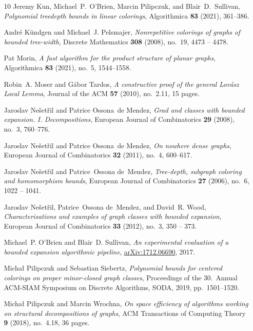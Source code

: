 \begin{thebibliography}{10}
Jeremy Kun, Michael~P.\ O'Brien, Marcin Pilipczuk, and Blair~D.\ Sullivan,
  \emph{Polynomial treedepth bounds in linear colorings}, Algorithmica
  \textbf{83} (2021), 361--386.

André Kündgen and Michael~J. Pelsmajer, \emph{Nonrepetitive colorings of
  graphs of bounded tree-width}, Discrete Mathematics \textbf{308} (2008),
  no.~19, 4473 -- 4478.

Pat Morin, \emph{A fast algorithm for the product structure of planar graphs},
  Algorithmica \textbf{83} (2021), no.~5, 1544--1558.

Robin~A. Moser and G\'{a}bor Tardos, \emph{A constructive proof of the general
  {L}ov\'{a}sz {L}ocal {L}emma}, Journal of the ACM \textbf{57} (2010),
  no.~2.11, 15 pages.

Jaroslav Ne{\v{s}}et{\v{r}}il and Patrice Ossona~de Mendez, \emph{Grad and
  classes with bounded expansion. {I}. {D}ecompositions}, European Journal of
  Combinatorics \textbf{29} (2008), no.~3, 760--776.

{J}aroslav Ne{\v{s}}et{\v{r}}il and Patrice Ossona~de Mendez, \emph{On nowhere
  dense graphs}, European Journal of Combinatorics \textbf{32} (2011), no.~4,
  600--617.

Jaroslav Nešetřil and Patrice~Ossona de~Mendez, \emph{Tree-depth, subgraph
  coloring and homomorphism bounds}, European Journal of Combinatorics
  \textbf{27} (2006), no.~6, 1022 -- 1041.

Jaroslav Nešetřil, Patrice~Ossona de~Mendez, and David~R. Wood,
  \emph{Characterisations and examples of graph classes with bounded
  expansion}, European Journal of Combinatorics \textbf{33} (2012), no.~3, 350
  -- 373.

Michael~P. O’Brien and Blair~D. Sullivan, \emph{An experimental evaluation of
  a bounded expansion algorithmic pipeline},
  \href{https://arxiv.org/abs/1712.06690}{arXiv:1712.06690}, 2017.

Micha{\l} Pilipczuk and Sebastian Siebertz, \emph{Polynomial bounds for
  centered colorings on proper minor-closed graph classes}, Proceedings of the
  30.\ Annual ACM-SIAM Symposium on Discrete Algorithms, SODA, 2019,
  pp.~1501--1520.

Micha{\l} Pilipczuk and Marcin Wrochna, \emph{On space efficiency of algorithms
  working on structural decompositions of graphs}, ACM Transactions of
  Computing Theory \textbf{9} (2018), no.~4.18, 36 pages.


\end{thebibliography}

